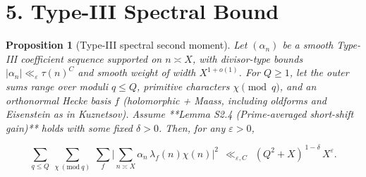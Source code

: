 \documentclass[11pt]{article}
\newtheorem{proposition}[lemma]{Proposition}
\theoremstyle{definition}
\theoremstyle{remark}
\begin{document}
\section*{5. Type-III Spectral Bound}

\begin{proposition}[Type-III spectral second moment]\label{prop:typeIII}
	Let $(\alpha_n)$ be a smooth Type-III coefficient sequence supported on $n\asymp X$, with divisor-type bounds $|\alpha_n|\ll_\varepsilon \tau(n)^C$ and smooth weight of width $X^{1+o(1)}$. For $Q\ge 1$, let the outer sums range over moduli $q\le Q$, primitive characters $\chi\pmod q$, and an orthonormal Hecke basis $f$ (holomorphic + Maass, including oldforms and Eisenstein as in Kuznetsov). Assume **Lemma S2.4 (Prime-averaged short-shift gain)** holds with some fixed $\delta>0$. Then, for any $\varepsilon>0$,

	$$
		\sum_{q\le Q}\ \sum_{\chi\ (\mathrm{mod}\ q)}\ \sum_{f}
		\Bigg|\sum_{n\asymp X}\alpha_n\,\lambda_f(n)\chi(n)\Bigg|^2
		\ \ \ll_{\varepsilon,C}\ \ (Q^2+X)^{\,1-\delta}\,X^{\varepsilon}.
	$$

\end{proposition}
\end{document}
